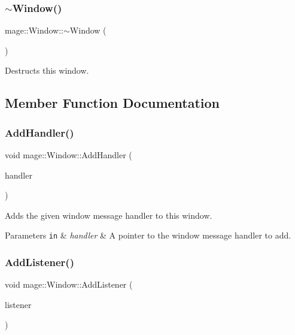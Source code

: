 \subsubsection{\texorpdfstring{$\sim$\+Window()}{~Window()}}
{\footnotesize\ttfamily mage\+::\+Window\+::$\sim$\+Window (\begin{DoxyParamCaption}{ }\end{DoxyParamCaption})\hspace{0.3cm}{\ttfamily [default]}}

Destructs this window. 

\subsection{Member Function Documentation}
\hypertarget{classmage_1_1_window_ae33b5ea74354830278c9ee130fa917c7}{}\label{classmage_1_1_window_ae33b5ea74354830278c9ee130fa917c7} 
\subsubsection{\texorpdfstring{Add\+Handler()}{AddHandler()}}
{\footnotesize\ttfamily void mage\+::\+Window\+::\+Add\+Handler (\begin{DoxyParamCaption}\item[{\hyperlink{classmage_1_1_window_add1d792fb9f71e70d4fb07409d80cfdd}{Window\+Message\+Handler\+Ptr}}]{handler }\end{DoxyParamCaption})}

Adds the given window message handler to this window.


\begin{DoxyParams}[1]{Parameters}
\mbox{\tt in}  & {\em handler} & A pointer to the window message handler to add. \\
\hline
\end{DoxyParams}
\hypertarget{classmage_1_1_window_ac6020962e1fd29118675207bde5d216d}{}\label{classmage_1_1_window_ac6020962e1fd29118675207bde5d216d} 
\subsubsection{\texorpdfstring{Add\+Listener()}{AddListener()}}
{\footnotesize\ttfamily void mage\+::\+Window\+::\+Add\+Listener (\begin{DoxyParamCaption}\item[{\hyperlink{classmage_1_1_window_a0e0a4f2a3f6db176f6aec454b94a06fb}{Window\+Message\+Listener\+Ptr}}]{listener }\end{DoxyParamCaption})}

